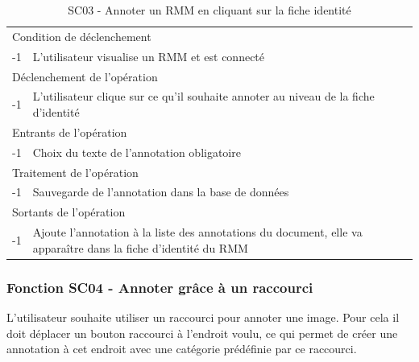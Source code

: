 \documentclass[a4paper]{article}
\begin{document}
\begin{table}[H]
  \centering
   \small
	\begin{tabular}{|c|p{12cm}|}
   		\hline
   			\rowcolor{lightgray}\multicolumn{2}{|c|}{\textbf{SC03 -  Annoter un RMM en cliquant sur la fiche identité}} \\
   		\hline
   			\multicolumn{2}{|l|}{Condition de d\'eclenchement} \\
   		\hline
   		-1 & L'utilisateur visualise un RMM et est connecté\\
   		\hline
   			\multicolumn{2}{|l|}{D\'eclenchement de l'op\'eration} \\
   		\hline
   			-1 & L’utilisateur clique sur ce qu’il souhaite annoter au niveau de la fiche d’identité\\
   		\hline
   			\multicolumn{2}{|l|}{Entrants de l'op\'eration} \\
   		\hline
        	-1 & Choix du texte de l’annotation obligatoire\\
   		\hline
   			\multicolumn{2}{|l|}{Traitement de l'op\'eration} \\
  		\hline
   			-1 & Sauvegarde de l’annotation dans la base de données\\

   		\hline
   			\multicolumn{2}{|l|}{Sortants de l'op\'eration} \\
   		\hline
   			-1 & Ajoute l’annotation à la liste des annotations du document, elle va apparaître dans
la fiche d’identité du RMM\\
   		\hline
	\end{tabular}
  \caption{SC03 - Annoter un RMM en cliquant sur la fiche identité}
  \normalsize
  \label{tab:annotation_fiche}
\end{table}

\subsubsection{Fonction SC04 - Annoter grâce à un raccourci}
L’utilisateur souhaite utiliser un raccourci pour annoter une image. Pour cela il doit déplacer un bouton raccourci à l’endroit voulu, ce qui permet de créer une annotation à cet endroit avec une catégorie prédéfinie par ce raccourci.\\
\end{document}
